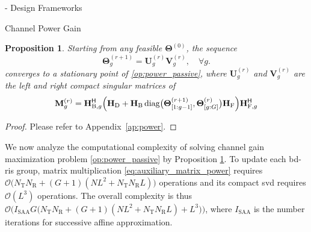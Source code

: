 \documentclass[journal]{IEEEtran}
\DeclareMathOperator{\diag}{diag}
\newtheorem{proposition}{Proposition}
\begin{document}
\begin{section}{- Design Frameworks}
\begin{subsection}{Channel Power Gain}
		\begin{proposition}\label{pp:power}
			Starting from any feasible $\mathbf{\Theta}^{(0)}$, the sequence
			\begin{equation}
				\mathbf{\Theta}_g^{(r+1)} = \mathbf{U}_g^{(r)} \mathbf{V}_g^{(r)}, \quad \forall g.
				\label{eq:scattering_power}
			\end{equation}
			converges to a stationary point of \eqref{op:power_passive}, where $\mathbf{U}_g^{(r)}$ and $\mathbf{V}_g^{(r)}$ are the left and right compact singular matrices of
			\begin{equation}
				\mathbf{M}_g^{(r)} = \mathbf{H}_{\mathrm{B},g}^\mathsf{H} \Bigl(\mathbf{H}_\mathrm{D} + \mathbf{H}_\mathrm{B} \diag\bigl(\mathbf{\Theta}_{[1:g-1]}^{(r+1)},\mathbf{\Theta}_{[g:G]}^{(r)}\bigr) \mathbf{H}_\mathrm{F}\Bigr) \mathbf{H}_{\mathrm{F},g}^\mathsf{H}
				\label{eq:auxiliary_matrix_power}
			\end{equation}
		\end{proposition}

		\begin{proof}
			Please refer to Appendix~\ref{ap:power}.
		\end{proof}

		We now analyze the computational complexity of solving channel gain maximization problem \eqref{op:power_passive} by Proposition \ref{pp:power}.
		To update each \gls{bd}-\gls{ris} group, matrix multiplication \eqref{eq:auxiliary_matrix_power} requires $\mathcal{O}\bigl(N_\mathrm{T} N_\mathrm{R} + (G+1)(NL^2+N_\mathrm{T} N_\mathrm{R} L)\bigr)$ operations and its compact \gls{svd} requires $\mathcal{O}(L^3)$ operations.
		The overall complexity is thus $\mathcal{O}\bigl(I_\text{SAA} G \bigl(N_\mathrm{T} N_\mathrm{R} + (G+1)(NL^2+N_\mathrm{T} N_\mathrm{R} L) + L^3\bigr)\bigr)$, where $I_\text{SAA}$ is the number iterations for successive affine approximation.
	\end{subsection}


\end{section}
\end{document}
